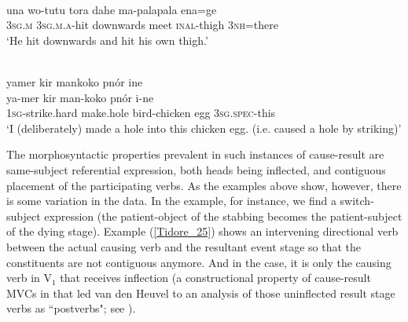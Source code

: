 \ea \label{Tidore_25}
\\
\gll una wo-tutu tora dahe ma-palapala ena=ge \\
3\textsc{sg}.\textsc{m} 3\textsc{sg}.\textsc{m}.\textsc{a}-hit downwards meet \textsc{inal}-thigh 3\textsc{nh}=there \\
\glft `He hit downwards and hit his own thigh.'\\
\z

\ea \label{Biak002}
\\
\glll yamer kir mankoko pnór ine \\
ya-mer kir man-koko pnór i-ne \\
\textsc{1}\textsc{sg}-strike.hard make.hole bird-chicken egg \textsc{3}\textsc{sg}.\textsc{spec}-this \\
\glft `I (deliberately) made a hole into this chicken egg. (i.e. caused a hole by striking)'\\ 
\z

The morphosyntactic properties prevalent in such instances of cause-result are same-subject referential expression, both heads being inflected, and contiguous placement of the participating verbs. As the examples above show, however, there is some variation in the data. In the  example, for instance, we find a switch-subject expression (the patient-object of the stabbing becomes the patient-subject of the dying stage). Example (\ref{Tidore_25}) shows an intervening directional verb between the actual causing verb and the resultant event stage so that the constituents are not contiguous anymore. And in the  case, it is only the causing verb in V$_1$ that receives inflection (a constructional property of cause-result MVCs in  that led van den Heuvel to an analysis of those uninflected result stage verbs as ``postverbs"; see \citealt[187]{vanheuvel2006}).

